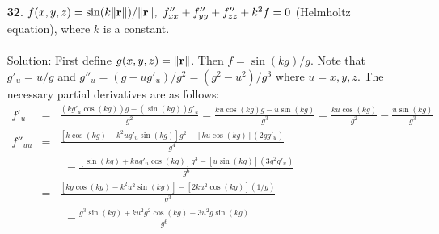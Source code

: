 \documentclass[12pt]{amsbook}
\begin{document}
\begin{enumerate}
\\
\\
{\sc Solution}: I will first calculate the necessary partial derivatives as follows. Note that $\|{\bf r}\|=\sqrt{{\bf r}\cdot{\bf r}}$. Thus $f=({\bf r}\cdot{\bf r})^{1-m/2}$
\begin{eqnarray*}
f''_{x_ix_i}&=&((1-m/2)({\bf r}\cdot{\bf r})^{-m/2}[{\bf r}'_{x_i}\cdot{\bf r}+{\bf r}\cdot{\bf r}'_{x_i}])'_{x_i}=((2-m)x_i({\bf r}\cdot{\bf r})^{-m/2})'_{x_i} \\
&=& (2-m)[({\bf r}\cdot{\bf r})^{-m/2}+x_i(-m/2)({\bf r}\cdot{\bf r})^{-m/2-1}(2x_i)]=\frac{(2-m)[{\bf r}\cdot{\bf r}-mx_i^2]}{({\bf r}\cdot{\bf r})^{m/2+1}}
\end{eqnarray*}
for $i=1,2,...,m$.
Then we have that
\begin{eqnarray*}
&&\frac{(2-m)[{\bf r}\cdot{\bf r}-mx_1^2]}{({\bf r}\cdot{\bf r})^{m/2+1}}+\frac{(2-m)[{\bf r}\cdot{\bf r}-mx_2^2]}{({\bf r}\cdot{\bf r})^{m/2+1}}+...+\frac{(2-m)[{\bf r}\cdot{\bf r}-mx_m^2]}{({\bf r}\cdot{\bf r})^{m/2+1}} \\
&=&\frac{2-m}{({\bf r}\cdot{\bf r})^{m/2+1}} \sum_{k=1}^m[{\bf r}\cdot{\bf r}-mx_i^2]=\frac{2-m}{({\bf r}\cdot{\bf r})^{m/2+1}} [{\bf r}\cdot{\bf r}\sum_{k=1}^m(1)-m\sum_{k=1}^mx_i^2] \\
&=&\frac{2-m}{({\bf r}\cdot{\bf r})^{m/2+1}} [m{\bf r}\cdot{\bf r}-m{\bf r}\cdot{\bf r}]=0
\end{eqnarray*}
\item[{\small\bf 32}.] $f(x,y,z)=\sin(k\|{\bf r}\|)/\|{\bf r}\|, \ f''_{xx}+f''_{yy}+f''_{zz}+k^2f=0$ (Helmholtz equation), where $k$ is a constant.
\\
\\
{\sc Solution}: First define $g(x,y,z)=\|{\bf r}\|$. Then $f=\sin(kg)/g$. Note that $g'_u=u/g$ and $g''_u=(g-ug'_u)/g^2=(g^2-u^2)/g^3$ where $u=x,y,z$. The necessary partial derivatives are as follows:
\begin{eqnarray*}
f'_{u}&=&\frac{(kg'_u\cos(kg))g-(\sin(kg))g'_u}{g^2}=\frac{ku\cos(kg)g-u\sin(kg)}{g^3}=\frac{ku\cos(kg)}{g^2}-\frac{u\sin(kg)}{g^3} \\
f''_{uu}&=&\frac{[k\cos(kg)-k^2ug'_u\sin(kg)]g^2-[ku\cos(kg)](2gg'_u)}{g^4} \\
&&  \ \ -\frac{[\sin(kg)+kug'_u\cos(kg)]g^3-[u\sin(kg)](3g^2g'_u)}{g^6} \\
&=&\frac{[kg\cos(kg)-k^2u^2\sin(kg)]-[2ku^2\cos(kg)](1/g)}{g^3} \\
&& \ \ -\frac{g^3\sin(kg)+ku^2g^2\cos(kg)-3u^2g\sin(kg)}{g^6} \\

\end{eqnarray*}
\end{enumerate}
\end{document}
